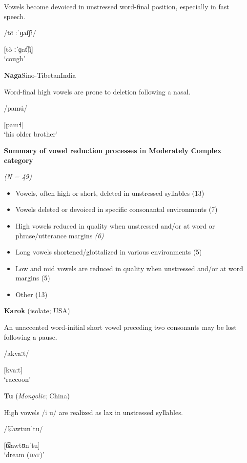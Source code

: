 \ea{}

Vowels become devoiced in unstressed word-final position, especially in fast speech.

/tõ ːˈɡat͡ʃi/

[tõ ːˈɡat͡ʃi̥]\\
\glt ‘cough’
\citep[60-1]{Facundes2000}

\ex{} \textbf{Naga}{Sino-Tibetan}{India}

Word-final high vowels are prone to deletion following a nasal.

/pamú/

[pam˧]\\
\glt ‘his older brother’
\citep[369]{Teo2012}
\z
\z

\ea\label{ex:6.17}
  \textbf{Summary of vowel reduction processes in Moderately Complex category} 

\textit{(N = 49)}

\begin{itemize}
\item Vowels, often high or short, deleted in unstressed syllables (13)
\item Vowels deleted or devoiced in specific consonantal environments (7)
\item High vowels reduced in quality when unstressed and/or at word or phrase/utterance margins \textit{(6)}
\item Long vowels shortened/glottalized in various environments (5)
\item Low and mid vowels are reduced in quality when unstressed and/or at word margins (5)
\item Other {(13)}
\end{itemize}

\ea   \textbf{Karok} (isolate; USA)

An unaccented word-initial short vowel preceding two consonants may be lost following a pause.

/akvaːt/

[kvaːt]\\
\glt ‘raccoon’
\citep[53]{Bright1957}

\ex  \textbf{Tu} (\textit{Mongolic}; China)

High vowels /i u/ are realized as lax in unstressed syllables. 

/t͡ɕawtunˈtu/

[t͡ɕawtʊnˈtu]\\
\glt ‘dream (\textsc{dat})’
\citep[35]{Slater2003}
\z
\z

